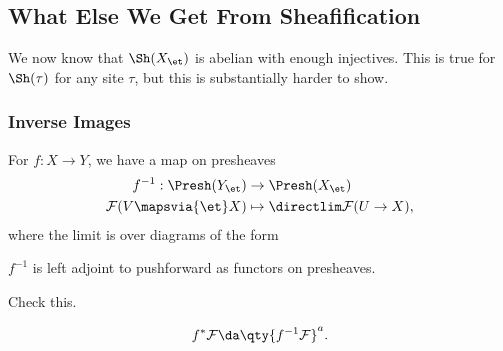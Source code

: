 \hypertarget{what-else-we-get-from-sheafification}{%
\subsection{What Else We Get From
Sheafification}\label{what-else-we-get-from-sheafification}}

\begin{remark}

We now know that \(\Sh(X_\et)\) is abelian with enough injectives. This
is true for \(\Sh(\tau)\) for any site \(\tau\), but this is
substantially harder to show.

\end{remark}

\hypertarget{inverse-images}{%
\subsubsection{Inverse Images}\label{inverse-images}}

For \(f:X\to Y\), we have a map on presheaves
\begin{align*}  
f^{-1} :\Presh(Y_{\et}) &\to \Presh(X_\et) \\
\mathcal{F}(V\mapsvia{\et} X) &\mapsto \directlim \mathcal{F}(U\to X)
,\end{align*} where the limit is over diagrams of the form

\begin{center}
\end{center}

\begin{fact}

\(f^{-1}\) is left adjoint to pushforward as functors on presheaves.

\end{fact}

\begin{exercise}[?]

Check this.

\end{exercise}

\begin{definition}

\begin{align*}  
f^* \mathcal{F} \da \qty{f^{-1} \mathcal{F}}^a
.\end{align*}

\end{definition}

